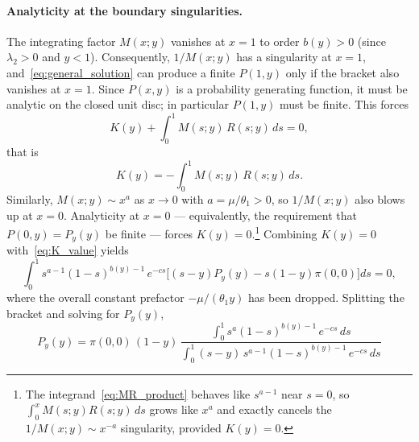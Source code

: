\paragraph{Analyticity at the boundary singularities.}
The integrating factor $M(x;y)$ vanishes at $x = 1$ to order $b(y) > 0$ (since $\lambda_2 > 0$ and $y < 1$). Consequently, $1/M(x;y)$ has a singularity at $x = 1$, and~\eqref{eq:general_solution} can produce a finite $P(1,y)$ only if the bracket also vanishes at $x = 1$. Since $P(x,y)$ is a probability generating function, it must be analytic on the closed unit disc; in particular $P(1,y)$ must be finite. This forces
\begin{equation}
    K(y) + \int_0^{1} M(s;y)\, R(s;y)\, ds = 0,
    \label{eq:analyticity_at_1}
\end{equation}
that is
\begin{equation}
    K(y) = -\int_0^{1} M(s;y)\, R(s;y)\, ds.
    \label{eq:K_value}
\end{equation}
Similarly, $M(x;y) \sim x^a$ as $x \to 0$ with $a = \mu/\theta_1 > 0$, so $1/M(x;y)$ also blows up at $x = 0$. Analyticity at $x = 0$ — equivalently, the requirement that $P(0,y) = P_y(y)$ be finite — forces $K(y) = 0$.\footnote{The integrand~\eqref{eq:MR_product} behaves like $s^{a-1}$ near $s = 0$, so $\int_0^x M(s;y)R(s;y)\,ds$ grows like $x^a$ and exactly cancels the $1/M(x;y) \sim x^{-a}$ singularity, provided $K(y) = 0$.} Combining $K(y) = 0$ with~\eqref{eq:K_value} yields
\begin{equation}
    \int_0^1 s^{a-1}(1-s)^{b(y)-1}\, e^{-cs}\Big[(s-y) P_y(y) - s(1-y)\pi(0,0)\Big] ds = 0,
\end{equation}
where the overall constant prefactor $-\mu/(\theta_1 y)$ has been dropped. Splitting the bracket and solving for $P_y(y)$,
\begin{equation}
    \boxed{\;
    P_y(y) = \pi(0,0)\,(1-y)\,
    \frac{\displaystyle\int_0^1 s^{a}(1-s)^{b(y)-1}\, e^{-cs}\, ds}
         {\displaystyle\int_0^1 (s-y)\, s^{a-1}(1-s)^{b(y)-1}\, e^{-cs}\, ds}\;}
    \label{eq:Py_formula}
\end{equation}

